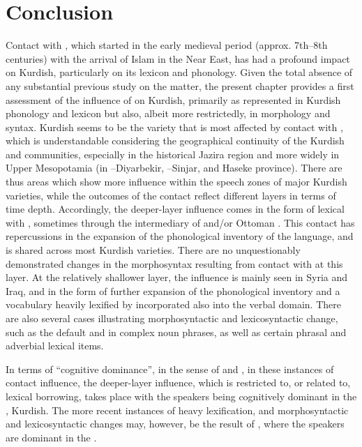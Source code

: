 \documentclass[output=paper]{langsci/langscibook}
\begin{document}
\section{Conclusion}
Contact with , which started in the early medieval period (approx. 7th–8th centuries) with the arrival of Islam in the Near East, has had a profound impact on Kurdish, particularly on its lexicon and phonology. Given the total absence of any substantial previous study on the matter, the present chapter provides a first assessment of the influence of  on Kurdish, primarily as represented in Kurdish phonology and lexicon but also, albeit more restrictedly, in morphology and syntax.  Kurdish seems to be the variety that is most affected by contact with , which is understandable considering the geographical continuity of the Kurdish and  communities, especially in the historical Jazira region and more widely in Upper Mesopotamia (in –Diyarbekir, –Sinjar, and Haseke province). There are thus areas which show more   influence within the speech zones of major Kurdish varieties, while the outcomes of the contact reflect different layers in terms of time depth. Accordingly, the deeper-layer influence comes in the form of lexical  with , sometimes through the intermediary of  and/or Ottoman . This contact has repercussions in the expansion of the phonological inventory of the language, and is shared across most Kurdish varieties. There are no unquestionably demonstrated changes in the morphosyntax resulting from contact with  at this layer. At the relatively shallower layer, the influence is mainly seen in Syria and Iraq, and in the form of further expansion of the phonological inventory and a vocabulary heavily lexified by   incorporated also into the verbal domain. There are also several cases illustrating morphosyntactic and lexicosyntactic change, such as the default  and  in complex noun phrases, as well as certain phrasal and adverbial lexical items. 

In terms of “cognitive dominance”, in the sense of \citet{VanCoetsem1988,VanCoetsem2000} and \citet{Lucas2015}, in these instances of contact influence, the deeper-layer influence, which is restricted to, or related to, lexical borrowing, takes place with the speakers being cognitively dominant in the , Kurdish. The more recent instances of heavy lexification, and morphosyntactic and lexicosyntactic changes may, however, be the result of , where the speakers are dominant in the . 
\end{document}
